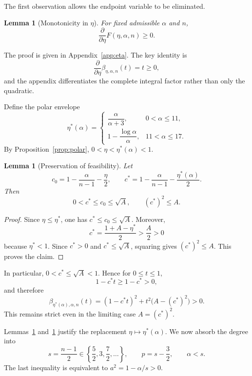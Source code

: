 \documentclass[11pt]{amsart}
\newtheorem{lemma}[theorem]{Lemma}
\theoremstyle{definition}
\newcommand{\etaStar}{\eta^{\ast}}
\begin{document}
The first observation allows the endpoint variable to be eliminated.

\begin{lemma}[Monotonicity in $\eta$]\label{lem:Feta}
For fixed admissible $\alpha$ and $n$,
\[
 \frac{\partial}{\partial\eta}F(\eta,\alpha,n)\ge0.
\]
\end{lemma}

The proof is given in Appendix~\ref{app:eta}.  The key identity is
\[
 \frac{\partial}{\partial\eta}\beta_{\eta,\alpha,n}(t)=t\ge0,
\]
and the appendix differentiates the complete integral factor rather than only the quadratic.

Define the polar envelope
\begin{equation}\label{eq:eta-star}
 \etaStar(\alpha)=
 \begin{cases}
 \dfrac{\alpha}{\alpha+3},&0<\alpha\le11,\\[2mm]
 1-\dfrac{\log\alpha}{\alpha},&11<\alpha\le17.
 \end{cases}
\end{equation}
By Proposition~\ref{prop:polar}, $0<\eta<\etaStar(\alpha)<1$.

\begin{lemma}[Preservation of feasibility]\label{lem:feasibility}
Let
\[
 c_0=1-\frac{\alpha}{n-1}-\frac\eta2,
 \qquad
 c^{\ast}=1-\frac{\alpha}{n-1}-\frac{\etaStar(\alpha)}2.
\]
Then
\[
 0<c^{\ast}\le c_0\le\sqrt A,
 \qquad (c^{\ast})^2\le A.
\]
\end{lemma}

\begin{proof}
Since $\eta\le\etaStar$, one has $c^{\ast}\le c_0\le\sqrt A$.  Moreover,
\[
 c^{\ast}
 =\frac{1+A-\etaStar}{2}
 >\frac A2>0
\]
because $\etaStar<1$.  Since $c^{\ast}>0$ and $c^{\ast}\le\sqrt A$, squaring gives $(c^{\ast})^2\le A$.  This proves the claim.
\end{proof}

In particular, $0<c^{\ast}\le\sqrt A<1$.  Hence for $0\le t\le1$,
\[
 1-c^{\ast}t\ge1-c^{\ast}>0,
\]
and therefore
\[
 \beta_{\etaStar(\alpha),\alpha,n}(t)
 =(1-c^{\ast}t)^2+t^2\bigl(A-(c^{\ast})^2\bigr)>0.
\]
This remains strict even in the limiting case $A=(c^{\ast})^2$.

Lemmas~\ref{lem:Feta} and~\ref{lem:feasibility} justify the replacement $\eta\mapsto\etaStar(\alpha)$.  We now absorb the degree into
\begin{equation}\label{eq:s-def}
 s=\frac{n-1}{2}
 \in\left\{\frac52,3,\frac72,\ldots\right\},
 \qquad
 p=s-\frac32,
 \qquad
 \alpha<s.
\end{equation}
The last inequality is equivalent to $a^2=1-\alpha/s>0$.
\end{document}
